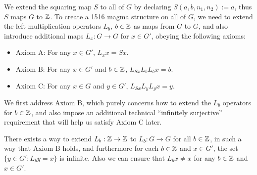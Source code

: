 We extend the squaring map $S$ to all of $G$ by declaring $S(a,b,n_1,n_2) := a$, thus $S$ maps $G$ to $\mathbb{Z}$.  To create a 1516 magma structure on all of $G$, we need to extend the left multiplication operators $L_b$, $b \in \mathbb{Z}$ as maps from $G$ to $G$, and also introduce additional maps $L_x: G \to G$ for $x \in G'$, obeying the following axioms:
\begin{itemize}
\item Axiom A: For any $x \in G'$, $L_x x = Sx$.
\item Axiom B: For any $x \in G'$ and $b \in \mathbb{Z}$, $L_{Sx} L_b L_b x = b$.
\item Axiom C: For any $x \in G$ and $y \in G'$, $L_{Sx} L_y L_y x = y$.
\end{itemize}

We first address Axiom B, which purely concerns how to extend the $L_b$ operators for $b \in \mathbb{Z}$, and also impose an additional technical ``infinitely surjective'' requirement that will help us satisfy Axiom C later.

\begin{proposition}\label{axiom-b}  There exists a way to extend $L_b: \mathbb{Z} \to \mathbb{Z}$ to $L_b: G \to G$ for all $b \in \mathbb{Z}$, in such a way that Axiom B holds, and furthermore for each $b \in \mathbb{Z}$ and $x \in G'$, the set $\{ y \in G': L_b y = x \}$ is infinite. Also we can ensure that $L_b x \neq x$ for any $b \in \mathbb{Z}$ and $x \in G'$.
\end{proposition}


